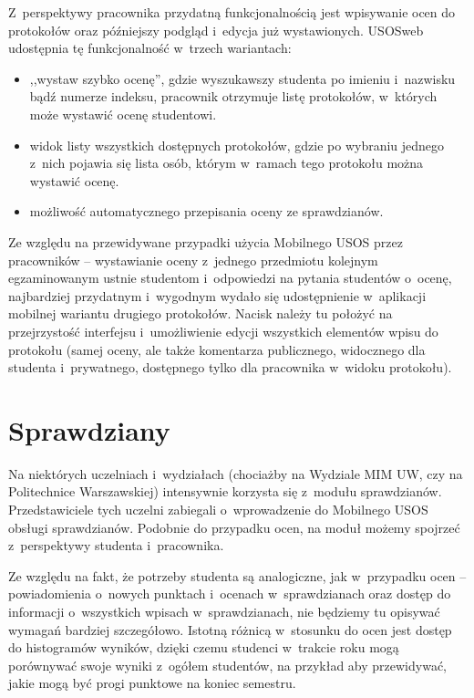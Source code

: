 \documentclass{pracamgr}
\begin{document}
Z~perspektywy pracownika przydatną funkcjonalnością jest wpisywanie ocen do protokołów
oraz późniejszy podgląd i~edycja już wystawionych. USOSweb udostępnia tę funkcjonalność
w~trzech wariantach:
\begin{itemize}
	\item ,,wystaw szybko ocenę'', gdzie wyszukawszy studenta po imieniu i~nazwisku bądź
	numerze indeksu, pracownik otrzymuje listę protokołów, w~których może wystawić ocenę
	studentowi.
	\item widok listy wszystkich dostępnych protokołów, gdzie po wybraniu jednego
	z~nich pojawia się lista osób, którym w~ramach tego protokołu można wystawić ocenę.
	\item możliwość automatycznego przepisania oceny ze sprawdzianów.
\end{itemize}

Ze względu na przewidywane przypadki użycia Mobilnego USOS przez pracowników --
wystawianie oceny z~jednego przedmiotu kolejnym egzaminowanym ustnie studentom
i~odpowiedzi na pytania studentów o~ocenę, najbardziej przydatnym i~wygodnym wydało się
udostępnienie w~aplikacji mobilnej wariantu drugiego protokołów. Nacisk należy tu położyć na
przejrzystość interfejsu i~umożliwienie edycji wszystkich elementów wpisu do protokołu
(samej oceny, ale także komentarza publicznego, widocznego dla studenta i~prywatnego,
dostępnego tylko dla pracownika w~widoku protokołu).

\section{Sprawdziany}

Na niektórych uczelniach i~wydziałach (chociażby na Wydziale MIM UW, czy na Politechnice
Warszawskiej) intensywnie korzysta się z~modułu sprawdzianów. Przedstawiciele tych
uczelni zabiegali o~wprowadzenie do Mobilnego USOS obsługi sprawdzianów.
Podobnie do przypadku ocen, na moduł możemy spojrzeć z~perspektywy studenta i~pracownika.

Ze względu na fakt, że potrzeby studenta są analogiczne, jak w~przypadku ocen -- powiadomienia
o~nowych punktach i~ocenach w~sprawdzianach oraz dostęp do informacji o~wszystkich wpisach
w~sprawdzianach, nie będziemy tu opisywać wymagań bardziej szczegółowo. Istotną różnicą
w~stosunku do ocen jest dostęp do histogramów wyników, dzięki czemu studenci w~trakcie
roku mogą porównywać swoje wyniki z~ogółem studentów, na przykład aby przewidywać, jakie
mogą być progi punktowe na koniec semestru.
\end{document}
